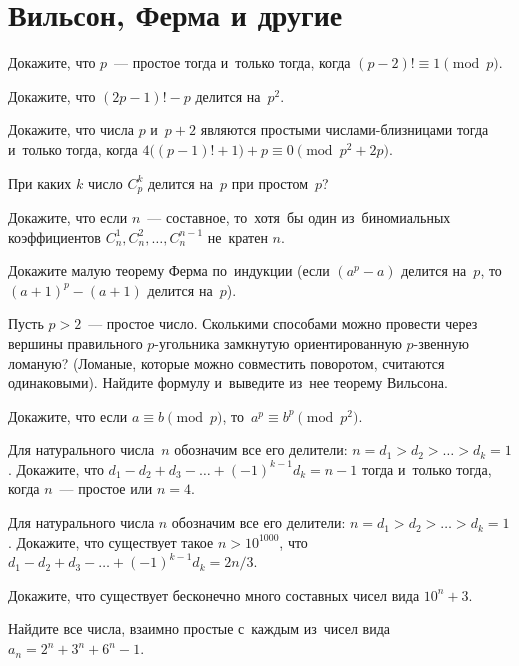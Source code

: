 
\section*{Вильсон, Ферма и другие}


\begin{problems}

\item
Докажите, что $p$~--- простое тогда и~только тогда, когда
$(p - 2)! \equiv 1 \pmod{p}$.

\item
Докажите, что $(2 p - 1)! - p$ делится на~$p^2$.

\item
Докажите, что числа $p$ и~$p + 2$ являются простыми числами-близницами
тогда и~только тогда, когда
\(
    4 \bigl( (p - 1)! + 1 \bigr) + p \equiv 0 \pmod{p^2 + 2 p}
\).

\item
При каких $k$ число $C_{p}^{k}$ делится на~$p$ при простом~$p$?

\item
Докажите, что если $n$~--- составное, то~хотя~бы один из~биномиальных
коэффициентов $C_{n}^{1}, C_{n}^{2}, \ldots, C_{n}^{n-1}$ не~кратен $n$.

\item
Докажите малую теорему Ферма по~индукции (если $(a^p - a)$ делится на~$p$,
то~$(a + 1)^p - (a + 1)$ делится на~$p$).

\item
Пусть $p > 2$~--- простое число.
Сколькими способами можно провести через вершины правильного $p$-угольника
замкнутую ориентированную $p$-звенную ломаную?
(Ломаные, которые можно совместить поворотом, считаются одинаковыми).
Найдите формулу и~выведите из~нее теорему Вильсона.

\item
Докажите, что если $a \equiv b \pmod{p}$, то~$a^p \equiv b^p \pmod{p^2}$.

\item
Для натурального числа~$n$ обозначим все его делители:
$n = d_1 > d_2 > \ldots > d_k = 1$.
Докажите, что $d_1 - d_2 + d_3 - \ldots + (-1)^{k - 1} d_k = n - 1$
тогда и~только тогда, когда $n$~--- простое или $n=4$.

\item
Для натурального числа $n$ обозначим все его делители:
$n = d_1 > d_2 > \ldots > d_k = 1$.
Докажите, что существует такое $n > 10^{1000}$, что
$d_1 - d_2 + d_3 - \ldots + (-1)^{k-1} d_k = 2 n / 3$.

\item
Докажите, что существует бесконечно много составных чисел вида $10^n + 3$.

\item
Найдите все числа, взаимно простые с~каждым из~чисел вида
$a_n = 2^n + 3^n + 6^n - 1$.

\end{problems}


